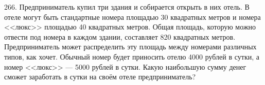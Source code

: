 266. Предприниматель купил три здания и собирается открыть в них отель. В отеле могут быть стандартные номера площадью 30 квадратных метров и номера <<люкс>> площадью 40 квадратных метров. Общая площадь, которую можно отвести под номера в каждом здании, составляет 820 квадратных метров. Предприниматель может распределить эту площадь между номерами различных типов, как хочет. Обычный номер будет приносить отелю 4000 рублей в сутки, а номер <<люкс>> --- 5000 рублей в сутки. Какую наибольшую сумму денег сможет заработать в сутки на своём отеле предприниматель?\\
